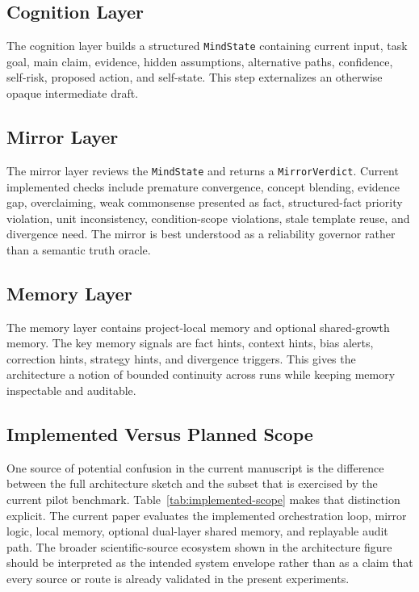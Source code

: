 \documentclass[12pt]{article}
\begin{document}
\subsection{Cognition Layer}

The cognition layer builds a structured \texttt{MindState} containing current input, task goal, main claim, evidence, hidden assumptions, alternative paths, confidence, self-risk, proposed action, and self-state. This step externalizes an otherwise opaque intermediate draft.

\subsection{Mirror Layer}

The mirror layer reviews the \texttt{MindState} and returns a \texttt{MirrorVerdict}. Current implemented checks include premature convergence, concept blending, evidence gap, overclaiming, weak commonsense presented as fact, structured-fact priority violation, unit inconsistency, condition-scope violations, stale template reuse, and divergence need. The mirror is best understood as a reliability governor rather than a semantic truth oracle.

\subsection{Memory Layer}

The memory layer contains project-local memory and optional shared-growth memory. The key memory signals are fact hints, context hints, bias alerts, correction hints, strategy hints, and divergence triggers. This gives the architecture a notion of bounded continuity across runs while keeping memory inspectable and auditable.

\subsection{Implemented Versus Planned Scope}

One source of potential confusion in the current manuscript is the difference between the full architecture sketch and the subset that is exercised by the current pilot benchmark. Table~\ref{tab:implemented-scope} makes that distinction explicit. The current paper evaluates the implemented orchestration loop, mirror logic, local memory, optional dual-layer shared memory, and replayable audit path. The broader scientific-source ecosystem shown in the architecture figure should be interpreted as the intended system envelope rather than as a claim that every source or route is already validated in the present experiments.
\end{document}
